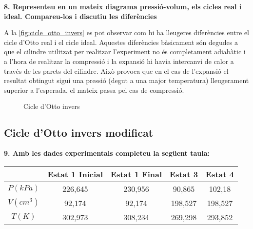 \documentclass[a4paper]{article}
\begin{document}
\textbf{8. Representeu en un mateix diagrama pressió-volum, els cicles real i ideal. Compareu-los i discutiu les diferències}

A la \autoref{fig:cicle_otto_invers} es pot observar com hi ha lleugeres diferències entre el cicle d'Otto real i el cicle ideal. Aquestes diferències bàsicament són degudes a que el cilindre utilitzat per realitzar l'experiment no és completament adiabàtic i a l'hora de realitzar la compressió i la expansió hi havia intercanvi de calor a través de les parets del cilindre. Això provoca que en el cas de l'expansió el resultat obtingut sigui una pressió (degut a una major temperatura) lleugerament superior a l'esperada, el mateix passa pel cas de compressió.

\begin{figure}[H]
    \centering
    \caption{Cicle d'Otto invers}
    \label{fig:cicle_otto_invers}
\end{figure}

\subsection*{Cicle d'Otto invers modificat}

\textbf{9. Amb les dades experimentals completeu la següent taula:}

\begin{tabular}{c|cccc}
    & Estat 1 Inicial & Estat 1 Final & Estat 3 & Estat 4 \\
    \hline
    $P(kPa)$ & 226,645 & 230,956 & 90,865 & 102,18 \\
    $V(cm^3)$ & 92,174 & 92,174 & 198,527 & 198,527 \\
    $T(K)$ & 302,973 & 308,234 & 269,298 & 293,852 \\
\end{tabular}
\end{document}
